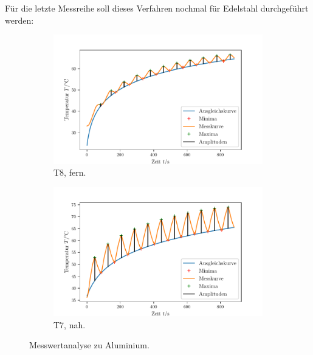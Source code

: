 Für die letzte Messreihe soll dieses Verfahren nochmal für Edelstahl durchgeführt werden:
\begin{figure}
    \centering
    \begin{subfigure}{.5\textwidth}
        \centering
        \includegraphics[max width=1.1\linewidth]{plots/amplitudes_brass_wide_far(t1).pdf} %
        \caption{T8, fern.}
        \label{fig:plot_amps_t8}
    \end{subfigure}%
    \begin{subfigure}{.5\textwidth}
        \centering
        \includegraphics[max width=1.1\linewidth]{plots/amplitudes_brass_wide_close(t2).pdf} %
        \caption{T7, nah.}
        \label{fig:plot_amps_t7}
    \end{subfigure}
    \caption{Messwertanalyse zu Aluminium.}
    \label{fig:plots_amps_t7_t8}
\end{figure}
